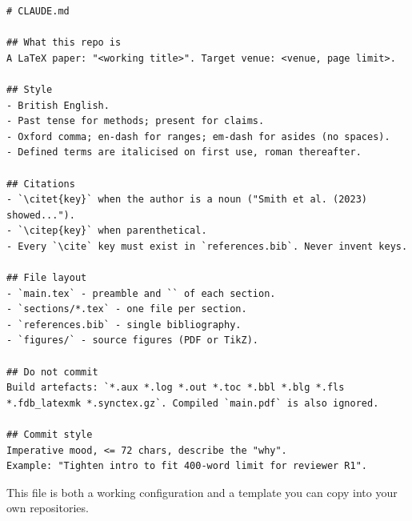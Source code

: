 \begin{lstlisting}[style=tex]
# CLAUDE.md

## What this repo is
A LaTeX paper: "<working title>". Target venue: <venue, page limit>.

## Style
- British English.
- Past tense for methods; present for claims.
- Oxford comma; en-dash for ranges; em-dash for asides (no spaces).
- Defined terms are italicised on first use, roman thereafter.

## Citations
- `\citet{key}` when the author is a noun ("Smith et al. (2023) showed...").
- `\citep{key}` when parenthetical.
- Every `\cite` key must exist in `references.bib`. Never invent keys.

## File layout
- `main.tex` - preamble and `` of each section.
- `sections/*.tex` - one file per section.
- `references.bib` - single bibliography.
- `figures/` - source figures (PDF or TikZ).

## Do not commit
Build artefacts: `*.aux *.log *.out *.toc *.bbl *.blg *.fls
*.fdb_latexmk *.synctex.gz`. Compiled `main.pdf` is also ignored.

## Commit style
Imperative mood, <= 72 chars, describe the "why".
Example: "Tighten intro to fit 400-word limit for reviewer R1".
\end{lstlisting}

This file is both a working configuration and a template you can copy into your own repositories.
